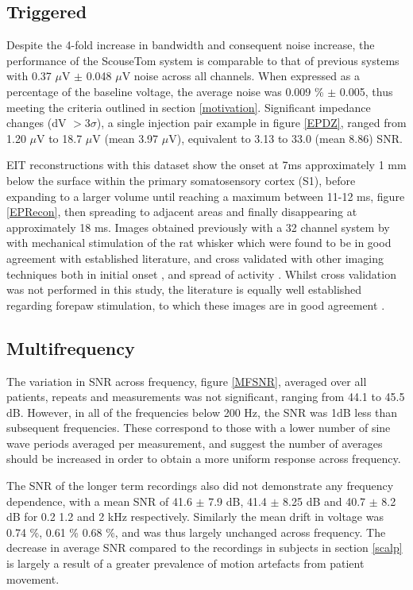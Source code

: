 \subsection{Triggered}

Despite the 4-fold increase in bandwidth and consequent noise increase, the performance of the ScouseTom system is comparable to that of previous systems \cite{Oh2011} with 0.37 $\mu$V $\pm$ 0.048 $\mu$V noise across all channels. When expressed as a percentage of the baseline voltage, the average noise was 0.009 \% $\pm$ 0.005, thus meeting the criteria outlined in section \ref{motivation}.  Significant impedance changes (dV $> 3\sigma$), a single injection pair example in figure \ref{EPDZ}, ranged from 1.20 $\mu$V to 18.7 $\mu$V (mean 3.97 $\mu$V), equivalent to 3.13 to 33.0 (mean 8.86) SNR. 

EIT reconstructions with this dataset show the onset at 7ms approximately 1 mm below the surface within the primary somatosensory cortex (S1), before expanding to a larger volume until reaching a maximum between 11-12 ms, figure \ref{EPRecon}, then spreading to adjacent areas and finally disappearing at approximately 18 ms. Images obtained previously with a 32 channel system by \citet{Aristovich_2016} with mechanical stimulation of the rat whisker which were found to be in good agreement with established literature, and cross validated with other imaging techniques both in initial onset \cite{armstrong1991thalamo}, and spread of activity \cite{petersen2007functional}. Whilst cross validation was not performed in this study, the literature is equally well established regarding forepaw stimulation, to which these images are in good agreement \cite{peeters2001comparing} \cite{masamoto2007relationship} \cite{lowe2007small}.

\subsection{Multifrequency}

The variation in SNR across frequency, figure \ref{MFSNR}, averaged over all patients, repeats and measurements was not significant, ranging from 44.1 to 45.5 dB.  However, in all of the frequencies below 200 Hz, the SNR was 1dB less than subsequent frequencies. These correspond to those with a lower number of sine wave periods averaged per measurement, and suggest the number of averages should be increased in order to obtain a more uniform response across frequency. 

The SNR of the longer term recordings also did not demonstrate any frequency dependence, with a mean SNR of 41.6 $\pm$ 7.9 dB, 41.4 $\pm$ 8.25 dB and 40.7 $\pm$ 8.2 dB for 0.2 1.2 and 2 kHz respectively. Similarly the mean drift in voltage was 0.74 \%, 0.61 \% 0.68 \%, and was thus largely unchanged across frequency. The decrease in average SNR compared to the recordings in subjects in section \ref{scalp} is largely a result of a greater prevalence of motion artefacts from patient movement. 



